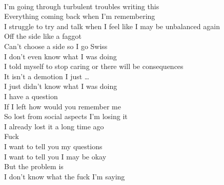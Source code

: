\documentclass[12pt, b5paper, oneside]{book}
\begin{document}
\\I'm going through turbulent troubles writing this 
\\Everything coming back when I'm remembering 
\\I struggle to try and talk when I feel like I may be unbalanced again
\\Off the side like a faggot 
\\Can't choose a side so I go Swiss
\\I don't even know what I was doing 
\\I told myself to stop caring or there will be consequences 
\\It isn't a demotion I just \dots 
\\I just didn't know what I was doing 
\\I have a question 
\\If I left how would you remember me 
\\So lost from social aspects I'm losing it 
\\I already lost it a long time ago
\\Fuck
\\I want to tell you my questions 
\\I want to tell you I may be okay 
\\But the problem is
\\I don't know what the fuck I'm saying 

\newpage
\end{document}

